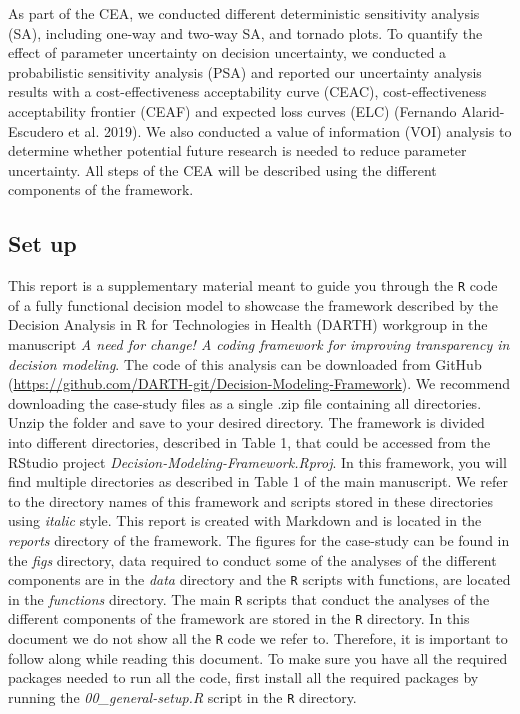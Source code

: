 \documentclass[]{article}
\begin{document}
As part of the CEA, we conducted different deterministic sensitivity
analysis (SA), including one-way and two-way SA, and tornado plots. To
quantify the effect of parameter uncertainty on decision uncertainty, we
conducted a probabilistic sensitivity analysis (PSA) and reported our
uncertainty analysis results with a cost-effectiveness acceptability
curve (CEAC), cost-effectiveness acceptability frontier (CEAF) and
expected loss curves (ELC) (Fernando Alarid-Escudero et al. 2019). We
also conducted a value of information (VOI) analysis to determine
whether potential future research is needed to reduce parameter
uncertainty. All steps of the CEA will be described using the different
components of the framework.

\subsection{Set up}\label{set-up}

This report is a supplementary material meant to guide you through the
\texttt{R} code of a fully functional decision model to showcase the
framework described by the Decision Analysis in R for Technologies in
Health (DARTH) workgroup in the manuscript \emph{A need for change! A
coding framework for improving transparency in decision modeling}. The
code of this analysis can be downloaded from GitHub
(\url{https://github.com/DARTH-git/Decision-Modeling-Framework}). We
recommend downloading the case-study files as a single .zip file
containing all directories. Unzip the folder and save to your desired
directory. The framework is divided into different directories,
described in Table 1, that could be accessed from the RStudio project
\emph{Decision-Modeling-Framework.Rproj}. In this framework, you will
find multiple directories as described in Table 1 of the main
manuscript. We refer to the directory names of this framework and
scripts stored in these directories using \emph{italic} style. This
report is created with Markdown and is located in the \emph{reports}
directory of the framework. The figures for the case-study can be found
in the \emph{figs} directory, data required to conduct some of the
analyses of the different components are in the \emph{data} directory
and the \texttt{R} scripts with functions, are located in the
\emph{functions} directory. The main \texttt{R} scripts that conduct the
analyses of the different components of the framework are stored in the
\texttt{R} directory. In this document we do not show all the \texttt{R}
code we refer to. Therefore, it is important to follow along while
reading this document. To make sure you have all the required packages
needed to run all the code, first install all the required packages by
running the \emph{00\_general-setup.R} script in the \texttt{R}
directory.
\end{document}
